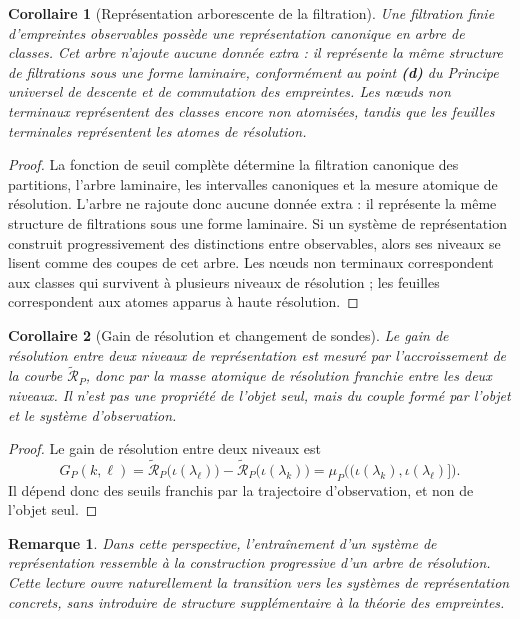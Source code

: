 \documentclass[11pt,a4paper]{article}
\newtheorem{corollary}{Corollaire}
\newtheorem{remark}{Remarque}
\begin{document}
\begin{appendices}
\begin{corollary}[Représentation arborescente de la filtration]
Une filtration finie d'empreintes observables possède une représentation canonique en arbre de classes. Cet arbre n'ajoute aucune donnée extra : il représente la même structure de filtrations sous une forme laminaire, conformément au point \textbf{(d)} du \emph{Principe universel de descente et de commutation des empreintes}. Les nœuds non terminaux représentent des classes encore non atomisées, tandis que les feuilles terminales représentent les atomes de résolution.
\end{corollary}

\begin{proof}
La fonction de seuil complète détermine la filtration canonique des partitions, l'arbre laminaire, les intervalles canoniques et la mesure atomique de résolution. L'arbre ne rajoute donc aucune donnée extra : il représente la même structure de filtrations sous une forme laminaire. Si un système de représentation construit progressivement des distinctions entre observables, alors ses niveaux se lisent comme des coupes de cet arbre. Les nœuds non terminaux correspondent aux classes qui survivent à plusieurs niveaux de résolution ; les feuilles correspondent aux atomes apparus à haute résolution.
\end{proof}

\begin{corollary}[Gain de résolution et changement de sondes]
Le gain de résolution entre deux niveaux de représentation est mesuré par l'accroissement de la courbe \(\widetilde{\mathcal R}_P\), donc par la masse atomique de résolution franchie entre les deux niveaux. Il n'est pas une propriété de l'objet seul, mais du couple formé par l'objet et le système d'observation.
\end{corollary}

\begin{proof}
Le gain de résolution entre deux niveaux est
\[
G_P(k,\ell)
=
\widetilde{\mathcal R}_P\bigl(\iota(\lambda_\ell)\bigr)
-
\widetilde{\mathcal R}_P\bigl(\iota(\lambda_k)\bigr)
=
\mu_P\bigl((\iota(\lambda_k),\iota(\lambda_\ell)]\bigr).
\]
Il dépend donc des seuils franchis par la trajectoire d'observation, et non de l'objet seul.
\end{proof}

\begin{remark}
Dans cette perspective, l'entraînement d'un système de représentation ressemble à la construction progressive d'un arbre de résolution. Cette lecture ouvre naturellement la transition vers les systèmes de représentation concrets, sans introduire de structure supplémentaire à la théorie des empreintes.
\end{remark}



\end{appendices}
\end{document}
